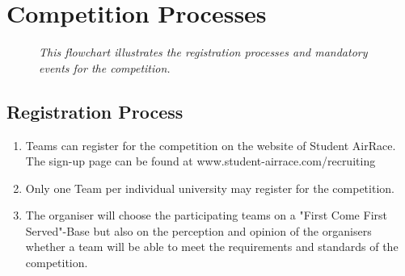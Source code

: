     \newpage
    \section{Competition Processes}

    \begin{figure}[h!]
      \centering
     \caption{\textit{This flowchart illustrates the registration processes and mandatory events for the competition.}}
     \end{figure}

    \subsection{Registration Process}
    \begin{enumerate}
      \item Teams can register for the competition on the website of Student AirRace. The sign-up page can be found at www.student-airrace.com/recruiting 
      \item Only one Team per individual university may register for the competition.  
      \item The organiser will choose the participating teams on a "First Come First Served"-Base but also
      on the perception and opinion of the organisers whether a team will be able to meet the requirements and standards of the competition. 
    \end{enumerate}


